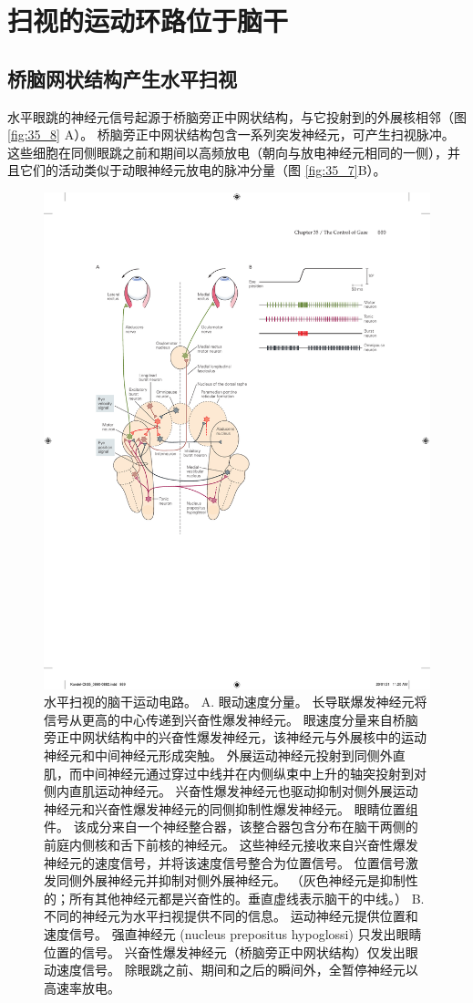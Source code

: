 \section{扫视的运动环路位于脑干}
\subsection{桥脑网状结构产生水平扫视}
水平眼跳的神经元信号起源于桥脑旁正中网状结构，与它投射到的外展核相邻（图 \ref{fig:35_8} A）。 
桥脑旁正中网状结构包含一系列突发神经元，可产生扫视脉冲。 这些细胞在同侧眼跳之前和期间以高频放电（朝向与放电神经元相同的一侧），并且它们的活动类似于动眼神经元放电的脉冲分量（图 \ref{fig:35_7}B）。

\begin{figure}[htbp]
	\centering
	\includegraphics[width=0.95\linewidth]{chap35/fig_35_8}
	\caption{水平扫视的脑干运动电路。 
		A. 眼动速度分量。 长导联爆发神经元将信号从更高的中心传递到兴奋性爆发神经元。 眼速度分量来自桥脑旁正中网状结构中的兴奋性爆发神经元，该神经元与外展核中的运动神经元和中间神经元形成突触。 外展运动神经元投射到同侧外直肌，而中间神经元通过穿过中线并在内侧纵束中上升的轴突投射到对侧内直肌运动神经元。 兴奋性爆发神经元也驱动抑制对侧外展运动神经元和兴奋性爆发神经元的同侧抑制性爆发神经元。 眼睛位置组件。 该成分来自一个神经整合器，该整合器包含分布在脑干两侧的前庭内侧核和舌下前核的神经元。 这些神经元接收来自兴奋性爆发神经元的速度信号，并将该速度信号整合为位置信号。 位置信号激发同侧外展神经元并抑制对侧外展神经元。 （灰色神经元是抑制性的；所有其他神经元都是兴奋性的。垂直虚线表示脑干的中线。） B. 不同的神经元为水平扫视提供不同的信息。 运动神经元提供位置和速度信号。 强直神经元 (nucleus prepositus hypoglossi) 只发出眼睛位置的信号。 兴奋性爆发神经元（桥脑旁正中网状结构）仅发出眼动速度信号。 除眼跳之前、期间和之后的瞬间外，全暂停神经元以高速率放电。}

\end{figure}
